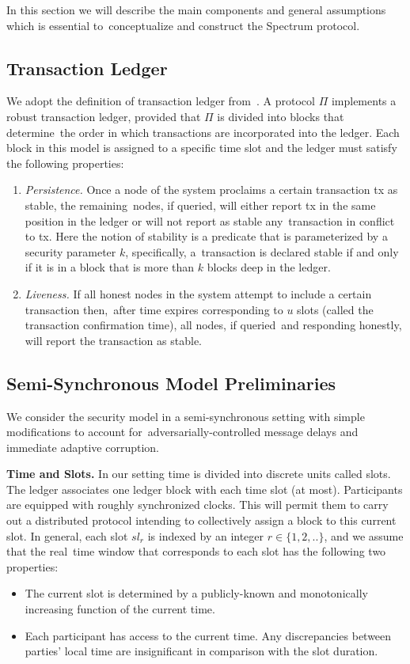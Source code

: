 In this section we will describe the main components and general assumptions which is essential to\
conceptualize and construct the Spectrum protocol.

\subsection{Transaction Ledger}\label{subsec:transaction-ledger.}
We adopt the definition of transaction ledger from~\cite{cryptoeprint:2016/889}.
A protocol $\Pi$ implements a robust transaction ledger, provided that $\Pi$ is divided into blocks that determine\
the order in which transactions are incorporated into the ledger.
Each block in this model is assigned to a specific time slot and the ledger must satisfy the following properties:
\begin{enumerate}
    \item \emph{Persistence.} Once a node of the system proclaims a certain transaction tx as stable, the remaining\
    nodes, if queried, will either report tx in the same position in the ledger or will not report as stable any\
    transaction in conflict to tx.
    Here the notion of stability is a predicate that is parameterized by a security parameter $k$, specifically, a\
    transaction is declared stable if and only if it is in a block that is more than $k$ blocks deep in the ledger.
    \item \emph{Liveness.} If all honest nodes in the system attempt to include a certain transaction then,\
    after time expires corresponding to $u$ slots (called the transaction confirmation time), all nodes, if queried\
    and responding honestly, will report the transaction as stable.
\end{enumerate}

\subsection{Semi-Synchronous Model Preliminaries}\label{subsec:the-semi-synchronous-model-preliminaries.}
We consider the security model in a semi-synchronous setting with simple modifications to account for\
adversarially-controlled message delays and immediate adaptive corruption.

\textbf{Time and Slots.}
In our setting time is divided into discrete units called slots.
The ledger associates one ledger block with each time slot (at most).
Participants are equipped with roughly synchronized clocks.
This will permit them to carry out a distributed protocol intending to collectively assign a block to this current slot.
In general, each slot $sl_r$ is indexed by an integer $r \in \{1, 2, ..\}$, and we assume that the real\
time window that corresponds to each slot has the following two properties:
\begin{itemize}
    \item The current slot is determined by a publicly-known and monotonically increasing function of the current time.
    \item Each participant has access to the current time.
    Any discrepancies between parties' local time are insignificant in comparison with the slot duration.
\end{itemize}

